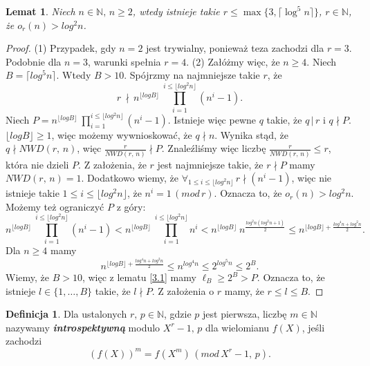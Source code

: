\documentclass[declaration,shortabstract]{iithesis}
\theoremstyle{definition}
\newtheorem{definition}{Definicja}
\theoremstyle{remark} \newtheorem{observation}{Obserwacja}
\theoremstyle{plain} \newtheorem{theorem}{Twierdzenie}
\theoremstyle{plain} \newtheorem{lemma}{Lemat}
\theoremstyle{remark} \newtheorem*{remark*}{Uwaga}
\theoremstyle{reminder} \newtheorem*{reminder*}{Przypomnienie}
\begin{document}
\begin{lemma}\label{r_szacowanie}
	Niech $n \in \mathbb{N}, \, n \geq 2$, wtedy istnieje takie $r \leq \max \{3, \lceil\log^5n\rceil \}$, $r \in \mathbb{N}$, że $o_r(n) > log^2n$.
\end{lemma}
	
\begin{proof}
	(1) Przypadek, gdy $n=2$ jest trywialny, ponieważ teza zachodzi dla $r=3$. Podobnie dla $n=3$, warunki spełnia $r=4$.\newline
	(2) Załóżmy więc, że $n \geq 4$. Niech $B = \lceil log^5n \rceil$. Wtedy $B > 10$. \newline
	Spójrzmy na najmniejsze takie $r$, że \[ r \, \nmid \, n^{\lfloor log B \rfloor} \: \prod_{i=1}^{i \leq \lfloor log^2 n \rfloor}(n^i - 1).\]
	Niech $P = n^{\lfloor log B \rfloor} \: \prod_{i=1}^{i \leq \lfloor log^2 n \rfloor}(n^i - 1)$. 
	Istnieje więc pewne $q$ takie, że $q \, | \, r$ i $q \nmid P$. $\lfloor log B \rfloor \geq 1$, więc możemy wywnioskować, że $q \nmid n$. Wynika stąd, że $q \nmid NWD(r,\, n)$, więc $\frac{r}{NWD(r, \, n)} \nmid P$. Znaleźliśmy więc liczbę $\frac{r}{NWD(r, \, n)} \leq r$, która nie dzieli $P$. Z założenia, że $r$ jest najmniejsze takie, że $r \nmid P$ mamy $NWD(r, \, n) = 1$.\newline
	Dodatkowo wiemy, że $\forall_{1 \leq i \leq \lfloor log^2 n \rfloor} \, r \nmid (n^i - 1)$, więc nie istnieje takie $1 \leq i \leq \lfloor log^2 n \rfloor$, że $n^i = 1 \, (mod \, r)$. Oznacza to, że $o_r(n) > log^2n$.
	Możemy też ograniczyć $P$ z góry:
	\[n^{\lfloor log B \rfloor} \: \prod_{i=1}^{i \leq \lfloor log^2 n \rfloor}(n^i - 1) < n^{\lfloor log B \rfloor} \: \prod_{i=1}^{i \leq \lfloor log^2 n \rfloor}n^i <  n^{\lfloor log B \rfloor} \: n^{\frac{log^2n(log^2n + 1)}{2}} \leq n^{{\lfloor log B \rfloor} + \frac{log^4n + log^2n}{2}}.\]
	Dla $n \geq 4$ mamy\[n^{{\lfloor log B \rfloor} + \frac{log^4n + log^2n}{2}} \leq n^{log^4n} \leq 2^{log^5n} \leq 2^B.\]
	Wiemy, że $B > 10$, więc z lematu \ref{3.1} mamy $\ell_B \geq 2^B > P$. Oznacza to, że istnieje $l \in \{1, \dots, B\}$ takie, że $l \nmid P$. Z założenia o $r$ mamy, że $r \leq l \leq B$.
\end{proof}
	
\begin{definition}
	Dla ustalonych $r, \, p \in \mathbb{N}$, gdzie $p$ jest pierwsza, liczbę $m \in \mathbb{N}$ nazywamy \textbf{\textit{introspektywną}} modulo $X^r - 1, \, p$ dla wielomianu $f(X)$, jeśli zachodzi \[(f(X))^m = f(X^m) \, (mod \, X^r - 1, \, p).\]
\end{definition}
	
\end{document}
